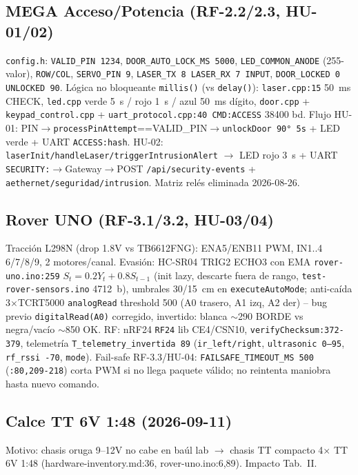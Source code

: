 \documentclass[conference]{IEEEtran}
\begin{document}
\subsection{MEGA Acceso/Potencia (RF-2.2/2.3, HU-01/02)}
\texttt{config.h}: \texttt{VALID\_PIN 1234}, \texttt{DOOR\_AUTO\_LOCK\_MS 5000}, \texttt{LED\_COMMON\_ANODE} (255-valor), \texttt{ROW/COL}, \texttt{SERVO\_PIN 9}, \texttt{LASER\_TX 8 LASER\_RX 7 INPUT}, \texttt{DOOR\_LOCKED 0 UNLOCKED 90}. Lógica no bloqueante \texttt{millis()} (vs \texttt{delay()}): \texttt{laser.cpp:15} 50~ms CHECK, \texttt{led.cpp} verde 5~s / rojo 1~s / azul 50~ms dígito, \texttt{door.cpp} + \texttt{keypad\_control.cpp} + \texttt{uart\_protocol.cpp:40 CMD:ACCESS} 38400 bd. Flujo HU-01: PIN$\rightarrow$\texttt{processPinAttempt}==VALID\_PIN$\rightarrow$\texttt{unlockDoor 90° 5s} + LED verde + UART \texttt{ACCESS:hash}. HU-02: \texttt{laserInit/handleLaser/triggerIntrusionAlert} $\rightarrow$ LED rojo 3~s + UART \texttt{SECURITY:}$\rightarrow$Gateway$\rightarrow$POST \texttt{/api/security-events} + \texttt{aethernet/seguridad/intrusion}. Matriz relés eliminada 2026-08-26.

\subsection{Rover UNO (RF-3.1/3.2, HU-03/04)}
Tracción L298N (drop 1.8V vs TB6612FNG): ENA5/ENB11 PWM, IN1..4 6/7/8/9, 2 motores/canal. Evasión: HC-SR04 TRIG2 ECHO3 con EMA \texttt{rover-uno.ino:259} $S_t=0.2Y_t+0.8S_{t-1}$ (init lazy, descarte fuera de rango, \texttt{test-rover-sensors.ino} 4712~b), umbrales 30/15~cm en \texttt{executeAutoMode}; anti-caída 3$\times$TCRT5000 \texttt{analogRead} threshold 500 (A0 trasero, A1 izq, A2 der) -- bug previo \texttt{digitalRead(A0)} corregido, invertido: blanca $\sim$290 BORDE vs negra/vacío $\sim$850 OK. RF: nRF24 \texttt{RF24} lib CE4/CSN10, \texttt{verifyChecksum:372-379}, telemetría \texttt{T\_telemetry\_invertida 89} (\texttt{ir\_left/right}, \texttt{ultrasonic 0--95}, \texttt{rf\_rssi -70}, \texttt{mode}). Fail-safe RF-3.3/HU-04: \texttt{FAILSAFE\_TIMEOUT\_MS 500} (\texttt{:80,209-218}) corta PWM si no llega paquete válido; no reintenta maniobra hasta nuevo comando.

\subsection{Calce TT 6V 1:48 (2026-09-11)}
Motivo: chasis oruga 9--12V no cabe en baúl lab $\rightarrow$ chasis TT compacto 4$\times$ TT 6V 1:48 (hardware-inventory.md:36, rover-uno.ino:6,89). Impacto Tab.~II.
\end{document}
